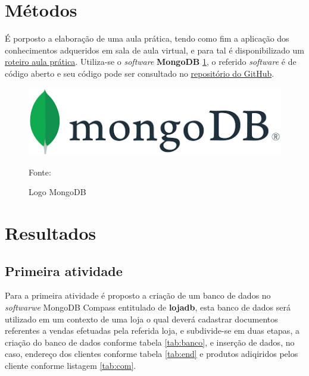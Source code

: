 \section{Métodos}

\par É porposto a elaboração de uma aula prática, tendo como fim a aplicação dos conhecimentos adqueridos em sala de aula virtual, e para tal é disponibilizado um \href{https://github.com/ENGENHARIA-DE-SOFTWARE-UNOPAR/NoSQL/blob/main/Roteiro-aula%20pratica.pdf}{roteiro aula prática}. Utiliza-se o \textit{software} \textbf{MongoDB} \ref{fig:logodb}, o referido \textit{software} é de código aberto e seu código pode ser consultado no \href{https://github.com/mongodb}{repositório do GitHub}.

\begin{figure}[H]
  \caption{Logo MongoDB}
  \includegraphics[scale=0.8]{figure/mongologo.png}
  \label{fig:logodb}

  {\fontsize{10pt}{\baselineskip}\selectfont
    Fonte: }
\end{figure}




\section{Resultados}
\subsection{Primeira atividade}\label{1atividade}
\par Para a primeira atividade é proposto a criação de um banco de dados no \textit{softwarwe} MongoDB Compass entitulado de \textbf{lojadb}, esta banco de dados será utilizado em um contexto de uma loja o qual deverá cadastrar documentos referentes a vendas efetuadas pela referida loja, e subdivide-se em duas etapas, a criação do banco de dados conforme tabela \ref{tab:banco}, e inserção de dados, no caso, endereço dos clientes conforme tabela \ref{tab:end} e produtos adiqiridos pelos cliente conforme listagem \ref{tab:com}.

